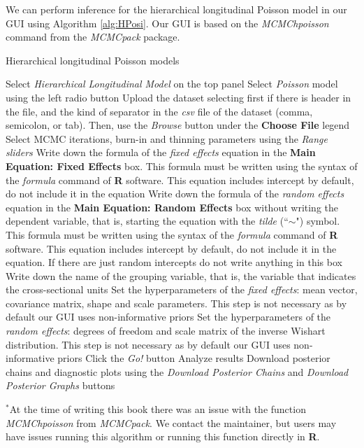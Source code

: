 We can perform inference for the hierarchical longitudinal Poisson model in our GUI using Algorithm \ref{alg:HPosi}. Our GUI is based on the \textit{MCMChpoisson} command from the \textit{MCMCpack} package.

\begin{algorithm}[h!]
	\caption{Hierarchical longitudinal Poisson models}\label{alg:HPosi}
	\begin{algorithmic}[1]  		 			
		\State Select \textit{Hierarchical Longitudinal Model} on the top panel
		\State Select \textit{Poisson} model using the left radio button
		\State Upload the dataset selecting first if there is header in the file, and the kind of separator in the \textit{csv} file of the dataset (comma, semicolon, or tab). Then, use the \textit{Browse} button under the \textbf{Choose File} legend
		\State Select MCMC iterations, burn-in and thinning parameters using the \textit{Range sliders}
		\State Write down the formula of the \textit{fixed effects} equation in the \textbf{Main Equation: Fixed Effects} box. This formula must be written using the syntax of the \textit{formula} command of \textbf{R} software. This equation includes intercept by default, do not include it in the equation
		\State Write down the formula of the \textit{random effects} equation in the \textbf{Main Equation: Random Effects} box without writing the dependent variable, that is, starting the equation with the \textit{tilde} (``$\sim$") symbol. This formula must be written using the syntax of the \textit{formula} command of \textbf{R} software. This equation includes intercept by default, do not include it in the equation. If there are just random intercepts do not write anything in this box
		\State Write down the name of the grouping variable, that is, the variable that indicates the cross-sectional units 
		\State Set the hyperparameters of the \textit{fixed effects}: mean vector, covariance matrix, shape and scale parameters. This step is not necessary as by default our GUI uses non-informative priors
		\State Set the hyperparameters of the \textit{random effects}: degrees of freedom and scale matrix of the inverse Wishart distribution. This step is not necessary as by default our GUI uses non-informative priors
		\State Click the \textit{Go!} button
		\State Analyze results
		\State Download posterior chains and diagnostic plots using the \textit{Download Posterior Chains} and \textit{Download Posterior Graphs} buttons
	\end{algorithmic}
	$^*${\footnotesize{At the time of writing this book there was an issue with the function \textit{MCMChpoisson} from \textit{MCMCpack}. We contact the maintainer, but users may have issues running this algorithm or running this function directly in \textbf{R}.}} 
\end{algorithm}


